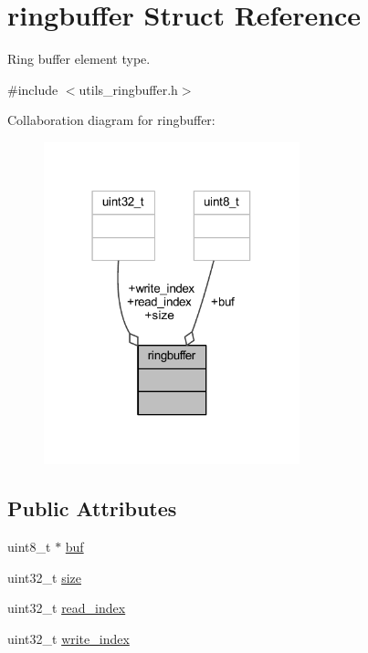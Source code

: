 \hypertarget{structringbuffer}{}\section{ringbuffer Struct Reference}
\label{structringbuffer}


Ring buffer element type.  




{\ttfamily \#include $<$utils\+\_\+ringbuffer.\+h$>$}



Collaboration diagram for ringbuffer\+:
\nopagebreak
\begin{figure}[H]
\begin{center}
\leavevmode
\includegraphics[width=210pt]{structringbuffer__coll__graph}
\end{center}
\end{figure}
\subsection*{Public Attributes}
\begin{DoxyCompactItemize}
\item 
uint8\+\_\+t $\ast$ \hyperlink{structringbuffer_a21e527bd1cee84a7b2c3d6d2da77584c}{buf}
\item 
uint32\+\_\+t \hyperlink{structringbuffer_a80a0c2fba71bab6481fe1a0bab9685ae}{size}
\item 
uint32\+\_\+t \hyperlink{structringbuffer_a1690488f3cc00713f660ab13ee18be5e}{read\+\_\+index}
\item 
uint32\+\_\+t \hyperlink{structringbuffer_a93936ef6a8e070e065448dbf49dcc93b}{write\+\_\+index}
\end{DoxyCompactItemize}


